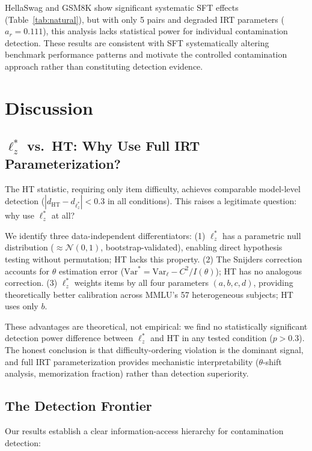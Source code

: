 \documentclass[11pt,a4paper]{article}
\begin{document}
HellaSwag and GSM8K show significant systematic SFT effects (Table~\ref{tab:natural}), but with only 5 pairs and degraded IRT parameters ($a_r = 0.111$), this analysis lacks statistical power for individual contamination detection. These results are consistent with SFT systematically altering benchmark performance patterns and motivate the controlled contamination approach rather than constituting detection evidence.

\section{Discussion}

\subsection{$\ell_z^*$ vs.\ HT: Why Use Full IRT Parameterization?}\label{sec:ht_discussion}

The HT statistic, requiring only item difficulty, achieves comparable model-level detection ($|d_{\text{HT}} - d_{\ell_z^*}| < 0.3$ in all conditions). This raises a legitimate question: why use $\ell_z^*$ at all?

We identify three data-independent differentiators: (1) $\ell_z^*$ has a parametric null distribution ($\approx \mathcal{N}(0,1)$, bootstrap-validated), enabling direct hypothesis testing without permutation; HT lacks this property. (2) The Snijders correction accounts for $\theta$ estimation error ($\text{Var}^* = \text{Var}_\ell - C^2/I(\theta)$); HT has no analogous correction. (3) $\ell_z^*$ weights items by all four parameters $(a, b, c, d)$, providing theoretically better calibration across MMLU's 57 heterogeneous subjects; HT uses only $b$.

These advantages are theoretical, not empirical: we find no statistically significant detection power difference between $\ell_z^*$ and HT in any tested condition ($p > 0.3$). The honest conclusion is that difficulty-ordering violation is the dominant signal, and full IRT parameterization provides mechanistic interpretability ($\theta$-shift analysis, memorization fraction) rather than detection superiority.

\subsection{The Detection Frontier}

Our results establish a clear information-access hierarchy for contamination detection:
\end{document}
